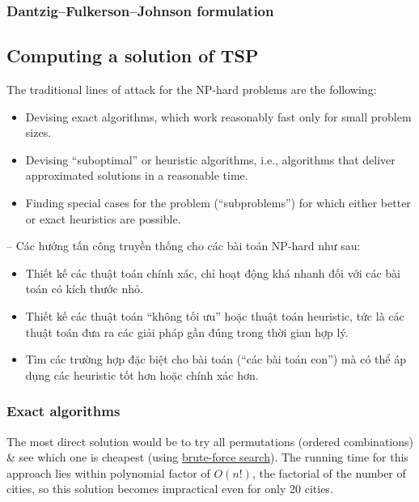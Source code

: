 \documentclass{article}
\begin{document}

\subsubsection{Dantzig--Fulkerson--Johnson formulation}


\subsection{Computing a solution of TSP}
The traditional lines of attack for the NP-hard problems are the following:
\begin{itemize}
    \item Devising exact algorithms, which work reasonably fast only for small problem sizes.
    \item Devising ``suboptimal'' or heuristic algorithms, i.e., algorithms that deliver approximated solutions in a reasonable time.
    \item Finding special cases for the problem (``subproblems'') for which either better or exact heuristics are possible.
\end{itemize}
-- Các hướng tấn công truyền thống cho các bài toán NP-hard như sau:
\begin{itemize}
    \item Thiết kế các thuật toán chính xác, chỉ hoạt động khá nhanh đối với các bài toán có kích thước nhỏ.
    \item Thiết kế các thuật toán ``không tối ưu'' hoặc thuật toán heuristic, tức là các thuật toán đưa ra các giải pháp gần đúng trong thời gian hợp lý.
    \item Tìm các trường hợp đặc biệt cho bài toán (``các bài toán con'') mà có thể áp dụng các heuristic tốt hơn hoặc chính xác hơn.
\end{itemize}



\subsubsection{Exact algorithms}
The most direct solution would be to try all permutations (ordered combinations) \& see which one is cheapest (using \href{https://en.wikipedia.org/wiki/Brute-force_search}{brute-force search}). The running time for this approach lies within polynomial factor of $O(n!)$, the factorial of the number of cities, so this solution becomes impractical even for only 20 cities.
\end{document}
